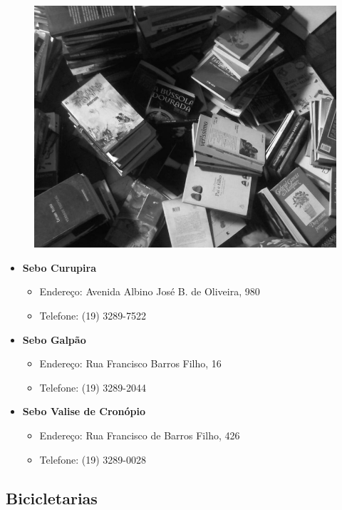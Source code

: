 \begin{figure}[h!]
    \centering
    \includegraphics[scale=0.29, keepaspectratio=true]{./img/imgs/9-outras_necessidades/-068.jpg}
\end{figure}


\begin{itemize}
\item  \textbf{Sebo Curupira}
\begin{itemize}
\item  Endereço: Avenida Albino José B. de Oliveira, 980
\item  Telefone: (19) 3289-7522
\end{itemize}

\item  \textbf{Sebo Galpão}
\begin{itemize}
\item  Endereço: Rua Francisco Barros Filho, 16
\item  Telefone: (19) 3289-2044
\end{itemize}

\item  \textbf{Sebo Valise de Cronópio}
\begin{itemize}
\item  Endereço: Rua Francisco de Barros Filho, 426
\item  Telefone: (19) 3289-0028
\end{itemize}
\end{itemize}

\subsection{Bicicletarias}

